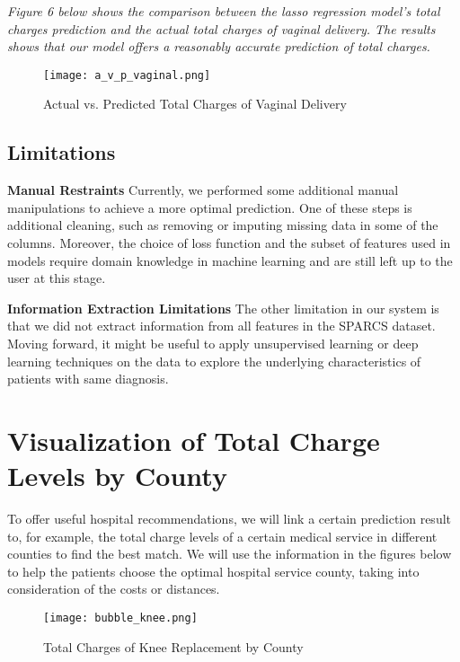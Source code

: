 \documentclass[12pt]{article}
\begin{document}
\noindent \textit{Figure 6 below shows the comparison between the lasso regression model's total charges prediction and the actual total charges of vaginal delivery. The results shows that our model offers a reasonably accurate prediction of total charges.}
\begin{figure}[H]
  \centering
    \texttt{[image: a\_v\_p\_vaginal.png]}
    \caption{Actual vs. Predicted Total Charges of Vaginal Delivery}
    \label{fig:boot_xgb}
\end{figure}

\subsection{Limitations}
\textbf{Manual Restraints}
Currently, we performed some additional manual manipulations to achieve a more optimal prediction. One of these steps is additional cleaning, such as removing or imputing missing data in some of the columns. Moreover, the choice of loss function and the subset of features used in models require domain knowledge in machine learning and are still left up to the user at this stage. 

\noindent \newline \textbf{Information Extraction Limitations}
The other limitation in our system is that we did not extract information from all features in the SPARCS dataset. Moving forward, it might be useful to apply unsupervised learning or deep learning techniques on the data to explore the underlying characteristics of patients with same diagnosis.

\section{Visualization of Total Charge Levels by County}
To offer useful hospital recommendations, we will link a certain prediction result to, for example, the total charge levels of a certain medical service in different counties to find the best match. We will use the information in the figures below to help the patients choose the optimal hospital service county, taking into consideration of the costs or distances.

\begin{figure}[H]
\texttt{[image: bubble\_knee.png]}
\caption{Total Charges of Knee Replacement by County}
\end{figure}
\end{document}
